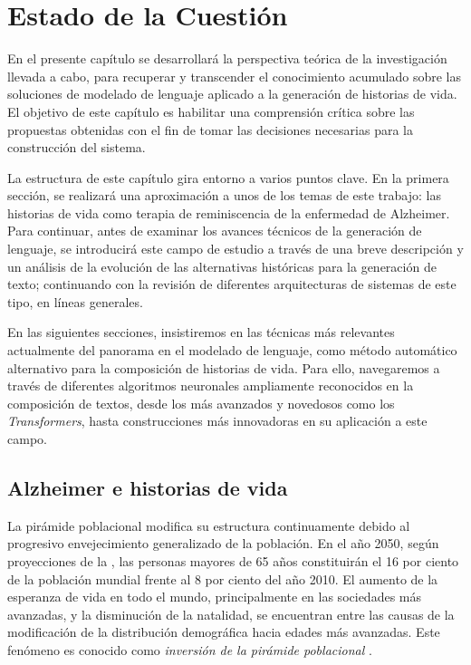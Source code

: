 \chapter{Estado de la Cuestión}
\label{cap:estadoDeLaCuestion}
En el presente capítulo se desarrollará la perspectiva teórica de la investigación llevada a cabo, para recuperar y transcender el conocimiento acumulado sobre las soluciones de modelado de lenguaje aplicado a la generación de historias de vida. El objetivo de este capítulo es habilitar una comprensión crítica sobre las propuestas obtenidas con el fin de tomar las decisiones necesarias para la construcción del sistema. 

La estructura de este capítulo gira entorno a varios puntos clave. En la primera sección, se realizará una aproximación a unos de los temas de este trabajo: las historias de vida como terapia de reminiscencia de la enfermedad de Alzheimer. Para continuar, antes de examinar los avances técnicos de la generación de lenguaje, se introducirá este campo de estudio a través de una breve descripción y un análisis de la evolución de las alternativas históricas para la generación de texto; continuando con la revisión de diferentes arquitecturas de sistemas de este tipo, en líneas generales. 

En las siguientes secciones, insistiremos en las técnicas más relevantes actualmente del panorama en el modelado de lenguaje, como método automático alternativo para la composición de historias de vida. 
Para ello, navegaremos a través de diferentes algoritmos neuronales ampliamente reconocidos en la composición de textos, desde los más avanzados y novedosos como los \textit{Transformers}, hasta construcciones más innovadoras en su aplicación a este campo.

\section{Alzheimer e historias de vida}
La pirámide poblacional modifica su estructura continuamente debido al progresivo envejecimiento generalizado de la población. En el año 2050, según proyecciones de la \cite{alzheimers-association-media-line-2021}, las personas mayores de 65 años constituirán el 16 por ciento de la población mundial frente al 8 por ciento del año 2010. El aumento de la esperanza de vida en todo el mundo, principalmente en las sociedades más avanzadas, y la disminución de la natalidad, se encuentran entre las causas de la modificación de la distribución demográfica hacia edades más avanzadas. Este fenómeno es conocido como \textit{inversión de la pirámide poblacional} \citep{RCSP892}.

